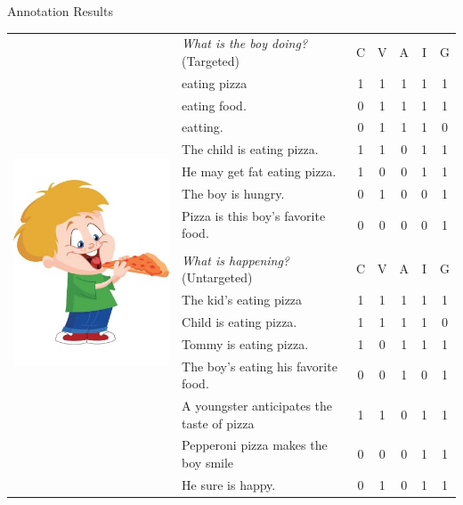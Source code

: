 \documentclass[final,14pt,t]{beamer}
\begin{document}
\begin{frame}{}
\begin{columns}[t]
\begin{column}{.33\linewidth}
\begin{minipage}[t][\textheight]{\linewidth}
\begin{block}{Annotation Results}
\begin{center}
\begin{minipage}{.85\textwidth}
\begin{table}[htb!]
\begin{center}
\setlength{\tabcolsep}{0.45em}
\begin{tabular}{|l||l|c|c|c|c|c|}
\hline
\multirow{17}{*}{\includegraphics[width=0.35\columnwidth]{../figures/I02.jpg}}& \textit{What is the boy doing?} (Targeted) & C & V & A & I & G \\
\cline{2-7}
\cline{2-7}
& eating pizza & 1 & 1 & 1 & 1 & 1 \\
\cline{2-7}
& eating food. & 0 & 1 & 1 & 1 & 1 \\
\cline{2-7}
& eatting. & 0 & 1 & 1 & 1 & 0 \\
\cline{2-7}
& The child is eating pizza. & 1 & 1 & 0 & 1 & 1 \\
\cline{2-7}
& He may get fat eating pizza. & 1 & 0 & 0 & 1 & 1 \\
\cline{2-7}
& The boy is hungry. & 0 & 1 & 0 & 0 & 1 \\
\cline{2-7}
& Pizza is this boy's favorite food. & 0 & 0 & 0 & 0 & 1 \\
\cline{2-7}
& \multicolumn{6}{c|}{} \\
\cline{2-7}
& \textit{What is happening?} (Untargeted) & C & V & A & I & G \\
\cline{2-7}
\cline{2-7}
& The kid's eating pizza & 1 & 1 & 1 & 1 & 1 \\
\cline{2-7}
& Child is eating pizza. & 1 & 1 & 1 & 1 & 0 \\
\cline{2-7}
& Tommy is eating pizza. & 1 & 0 & 1 & 1 & 1 \\
\cline{2-7}
& The boy's eating his favorite food. & 0 & 0 & 1 & 0 & 1 \\
\cline{2-7}
& A youngster anticipates the taste of pizza & 1 & 1 & 0 & 1 & 1 \\
\cline{2-7}
& Pepperoni pizza makes the boy smile & 0 & 0 & 0 & 1 & 1 \\
\cline{2-7}
& He sure is happy. & 0 & 1 & 0 & 1 & 1 \\

\end{tabular}
\end{center}
\end{table}
\end{minipage}
\end{center}
\end{block}
\end{minipage}
\end{column}
\end{columns}
\end{frame}
\end{document}
